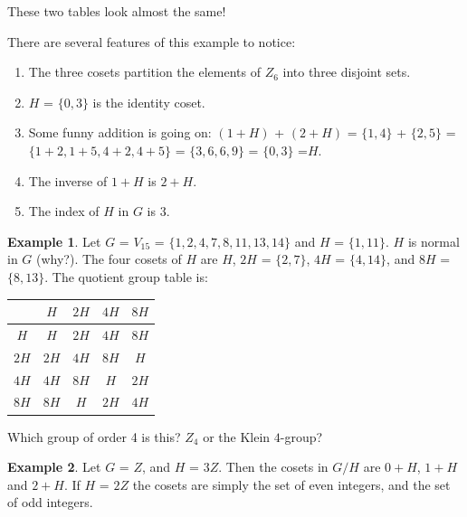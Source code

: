 \documentclass[12pt]{book}
\theoremstyle{definition}
\newtheorem{example}{Example}
\begin{document}
    These two tables look almost the same!

    There are several features of this example to notice:
    \begin{enumerate}

    \item
    The three cosets partition the elements of $Z_6$ into three disjoint sets.
    \item
    $H$ = $\{0,3\}$ is the identity coset.

    \item
    Some funny addition is going on: $(1+H)$ + $(2+H)$ = $\{1,4\}$ + $\{2,5\}$ = $\{1+2,1+5,4+2,4+5\}$ = $\{3,6,6,9\}$ = $\{0,3\}$ =$H$.

    \item
    The inverse of $1+H$ is $2+H$.
    \item
    The index of $H$ in $G$ is $3$.
    \end{enumerate}


\begin{example}  Let $G$ = $V_{15}$ = $\{1,2,4,7,8,11,13,14\}$ and $H$ =  $\{1,11\}$. $H$ is normal in $G$ (why?). The four cosets of $H$ are $H$, $2H$ = $\{2,7\}$,  $4H$ = $\{4,14\}$, and  $8H$ =   $\{8,13\}$. The quotient group table is:


    \begin{center}
        \begin{tabular}{c|cccc}
             & $H$ & $2H$ & $4H$ & $8H$  \\ \hline
        $H$  & $H$ & $2H$ & $4H$ & $8H$  \\
        $2H$ & $2H$ & $4H$ & $8H$ & $H$  \\
        $4H$ & $4H$ & $8H$ & $H$ & $2H$  \\
        $8H$ & $8H$ & $H$ & $2H$ & $4H$
        \end{tabular}
    \end{center}


    Which group of order 4 is this? $Z_4$ or the Klein $4$-group?

\end{example}


\begin{example}

Let $G$ = $Z$, and $H$ = $3Z$. Then the cosets in $G/H$ are $0+H$, $1+H$ and $2+H$. If $H$ = $2Z$ the cosets are simply the set of even integers, and the set of odd integers.

\end{example}
\end{document}

